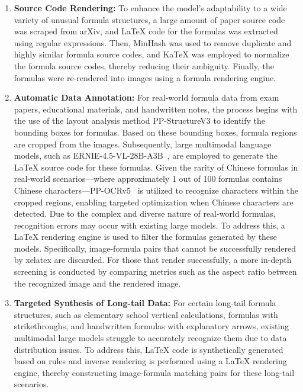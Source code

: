 \documentclass[11pt, a4paper,logo,  copyright, nonumbering]{paddleocr}
\begin{document}
\begin{enumerate}[label=\arabic*.]
\item \textbf{Source Code Rendering:} To enhance the model's adaptability to a wide variety of unusual formula structures, a large amount of paper source code was scraped from arXiv, and LaTeX code for the formulas was extracted using regular expressions. Then, MinHash was used to remove duplicate and highly similar formula source codes, and KaTeX was employed to normalize the formula source codes, thereby reducing their ambiguity. Finally, the formulas were re-rendered into images using a formula rendering engine.

\item \textbf{Automatic Data Annotation:} For real-world formula data from exam papers, educational materials, and handwritten notes, the process begins with the use of the layout analysis method PP-StructureV3 \cite{cui2025paddleocr} to identify the bounding boxes for formulas. Based on these bounding boxes, formula regions are cropped from the images. Subsequently, large multimodal language models, such as ERNIE-4.5-VL-28B-A3B~\cite{ernie2025technicalreport}, are employed to generate the LaTeX source code for these formulas. Given the rarity of Chinese formulas in real-world scenarios—where approximately 1 out of 100 formulas contains Chinese characters—PP-OCRv5~\cite{cui2025paddleocr} is utilized to recognize characters within the cropped regions, enabling targeted optimization when Chinese characters are detected. Due to the complex and diverse nature of real-world formulas, recognition errors may occur with existing large models. To address this, a LaTeX rendering engine is used to filter the formulas generated by these models. Specifically, image-formula pairs that cannot be successfully rendered by xelatex are discarded. For those that render successfully, a more in-depth screening is conducted by comparing metrics such as the aspect ratio between the recognized image and the rendered image.

\item \textbf{Targeted Synthesis of Long-tail Data:}  For certain long-tail formula structures, such as elementary school vertical calculations, formulas with strikethroughs, and handwritten formulas with explanatory arrows, existing multimodal large models struggle to accurately recognize them due to data distribution issues. To address this, LaTeX code is synthetically generated based on rules and inverse rendering is performed using a LaTeX rendering engine, thereby constructing image-formula matching pairs for these long-tail scenarios.


\end{enumerate}
\end{document}
